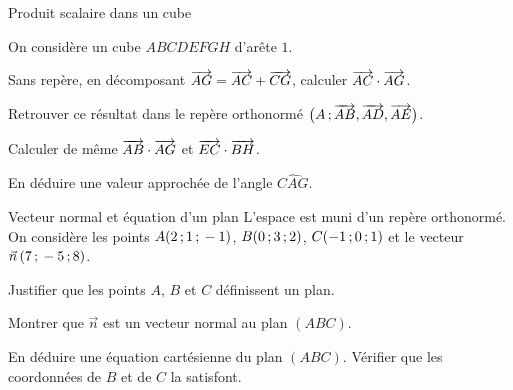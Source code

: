\begin{exercice}[1]{Produit scalaire dans un cube}
\begin{codecote}[0.6]
On considère un cube $ABCDEFGH$ d'arête $1$.
\begin{questions}
  \item Sans repère, en décomposant $\overrightarrow{AG}=\overrightarrow{AC}+\overrightarrow{CG}$, calculer $\overrightarrow{AC}\cdot\overrightarrow{AG}$.
  \item Retrouver ce résultat dans le repère orthonormé $\big(A\,{;}\,\overrightarrow{AB},\overrightarrow{AD},\overrightarrow{AE}\big)$.
  \item Calculer de même $\overrightarrow{AB}\cdot\overrightarrow{AG}$ et $\overrightarrow{EC}\cdot\overrightarrow{BH}$.
  \item En déduire une valeur approchée de l'angle $\widehat{CAG}$.
\end{questions}
\cote
\centering
{}
\end{codecote}
\end{exercice}

\begin{exercice}[1]{Vecteur normal et équation d'un plan}
L'espace est muni d'un repère orthonormé. On considère les points $A(2\,{;}\,1\,{;}\,-1)$, $B(0\,{;}\,3\,{;}\,2)$, $C(-1\,{;}\,0\,{;}\,1)$ et le vecteur
$\vec n\,(7\,{;}\,-5\,{;}\,8)$.
\begin{questions}
  \item Justifier que les points $A$, $B$ et $C$ définissent un plan.
  \item Montrer que $\vec n$ est un vecteur normal au plan $(ABC)$.
  \item En déduire une équation cartésienne du plan $(ABC)$. Vérifier que les coordonnées de $B$ et de $C$ la satisfont.
\end{questions}
\end{exercice}


